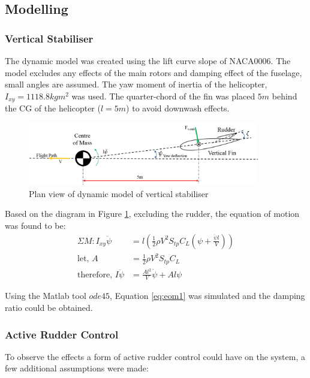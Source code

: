 \documentclass[11pt,a4paper]{article}
\begin{document}
\subsection{Modelling}
\subsubsection{Vertical Stabiliser}
The dynamic model was created using the lift curve slope of NACA0006. The model excludes any effects of the main rotors and damping effect of the fuselage, small angles are assumed. The yaw moment of inertia of the helicopter,$I_{xy}=1118.8 kgm^2$ was used. The quarter-chord of the fin was placed $5m$ behind the CG of the helicopter ($l=5m$) to avoid downwash effects. 
\begin{figure}[H]
	\centering
	\includegraphics[width=0.9\textwidth]{VertStabdiag.PNG}
	\caption{Plan view of dynamic model of vertical stabiliser}
	\centering
	\label{fig:vertdiag}
\end{figure}

Based on the diagram in Figure \ref{fig:vertdiag}, excluding the rudder, the equation of motion was found to be:
\begin{align}
\Sigma M: I_{xy}\ddot{\psi}&=l(\frac{1}{2}\rho V^2 S_{tp}C_L(\psi+\frac{\dot{\psi}l}{V})) \\
\text{let,}\,\, A&=\frac{1}{2}\rho V^2 S_{tp}C_L\\
 \text{therefore,}\,\,I\ddot{\psi}&=\frac{Al^2}{V}\dot{\psi}+A l\psi \label{eq:eom1}
\end{align}{}

Using the Matlab tool $ode45$, Equation \ref{eq:eom1} was simulated and the damping ratio could be obtained. \\

\subsubsection{Active Rudder Control}

To observe the effects a form of active rudder control could have on the system, a few additional assumptions were made:
\end{document}
